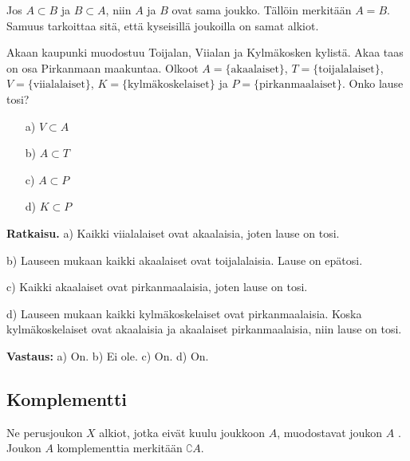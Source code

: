 Jos $A\subset B$ ja $B\subset A$, niin  $A$ ja $B$ ovat sama joukko. Tällöin merkitään $A=B$. Samuus tarkoittaa sitä, että kyseisillä joukoilla on samat alkiot. %

\begin{esimerkki}
Akaan kaupunki muodostuu Toijalan, Viialan ja Kylmäkosken
kylistä. Akaa taas on osa Pirkanmaan maakuntaa. Olkoot $A
= \{\textrm{akaalaiset}\}$, $T = \{\textrm{toijalalaiset}\}$, $V
= \{\textrm{viialalaiset}\}$, $K = \{\textrm{kylmäkoskelaiset}\} $ ja $P = \{\textrm{pirkanmaalaiset}\}$. Onko lause tosi?

\begin{itemize}
\item[a)] $V \subset A$
\item[b)] $A \subset T$
\item[c)] $A \subset P$
\item[d)] $K \subset P$
\end{itemize}


{\bf Ratkaisu.}
a) Kaikki viialalaiset ovat akaalaisia, joten lause on
tosi.

b) Lauseen mukaan kaikki akaalaiset ovat toijalalaisia.
Lause on epätosi.

c) Kaikki akaalaiset ovat pirkanmaalaisia, joten lause on
tosi.

d) Lauseen mukaan kaikki kylmäkoskelaiset ovat
pirkanmaalaisia. Koska kylmäkoskelaiset ovat akaalaisia
ja akaalaiset pirkanmaalaisia, niin lause on tosi.

{\bf Vastaus:} a) On. b) Ei ole. c) On. d) On.
\end{esimerkki}

\subsection*{Komplementti}
Ne perusjoukon $X$ alkiot, jotka eivät kuulu joukkoon $A$, muodostavat joukon $A$ . Joukon $A$ komplementtia merkitään $\complement A$.

\begin{center}



\end{center}

